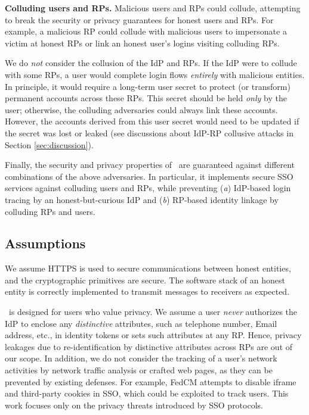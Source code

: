 \noindent \textbf{Colluding users and RPs.}
Malicious users and RPs could collude,
 attempting to break the security or privacy guarantees for honest users and RPs.
For example, a malicious RP could collude with malicious users to %
 impersonate a victim at honest RPs or link an honest user's logins visiting colluding RPs.

We do \emph{not} consider the collusion of the IdP and RPs.
If the IdP were to collude with some RPs, a user would complete login flows \emph{entirely} with malicious entities. 
In principle, it would require a long-term user secret to protect (or transform) permanent accounts across these RPs.
This secret should be held \emph{only} by the user; otherwise, the colluding adversaries could always link these accounts.
However, the accounts derived from this user secret would need to be updated if the secret was lost or leaked (see discussions about IdP-RP collusive attacks in Section \ref{sec:discussion}).

Finally, the security and privacy properties of \usso\ are guaranteed against different combinations of the above adversaries.
In particular, it implements secure SSO services against colluding users and RPs,
        while preventing (\emph{a}) IdP-based login tracing by an honest-but-curious IdP
            and (\emph{b}) RP-based identity linkage by colluding RPs and users.

\subsection{Assumptions}
We assume HTTPS is used to secure communications between honest entities, and the cryptographic primitives are secure. The software stack of an honest entity is correctly implemented to transmit messages to receivers as expected.

\usso\ is designed for users who value privacy. We assume a user \emph{never} authorizes the IdP to enclose any \emph{distinctive} attributes, such as telephone number, Email address, etc., in identity tokens or sets such attributes at any RP. Hence, privacy leakages due to re-identification by distinctive attributes across RPs are out of our scope.
In addition, we do not consider the tracking of a user's network activities by network traffic analysis or crafted web pages, as they can be prevented by existing defenses.
For example, FedCM \cite{FedCM} attempts to disable iframe and third-party cookies in SSO, which could be exploited to track users. This work focuses only on the privacy threats introduced by SSO protocols.



